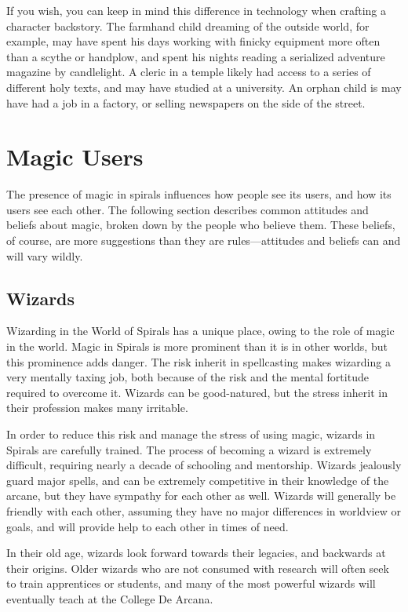 \begin{multicols}{2}
If you wish, you can keep in mind this difference in technology when crafting a character backstory.
The farmhand child dreaming of the outside world, for example, may have spent his days working with finicky equipment more often than a scythe or handplow, and spent his nights reading a serialized adventure magazine by candlelight.
A cleric in a temple likely had access to a series of different holy texts, and may have studied at a university.
An orphan child is may have had a job in a factory, or selling newspapers on the side of the street.

\section{Magic Users}
The presence of magic in spirals influences how people see its users, and how its users see each other.
The following section describes common attitudes and beliefs about magic, broken down by the people who believe them.
These beliefs, of course, are more suggestions than they are rules---attitudes and beliefs can and will vary wildly.

\subsection{Wizards}
Wizarding in the World of Spirals has a unique place, owing to the role of magic in the world.
Magic in Spirals is more prominent than it is in other worlds, but this prominence adds danger.
The risk inherit in spellcasting makes wizarding a very mentally taxing job, both because of the risk and the mental fortitude required to overcome it.
Wizards can be good-natured, but the stress inherit in their profession makes many irritable. 

In order to reduce this risk and manage the stress of using magic, wizards in Spirals are carefully trained.
The process of becoming a wizard is extremely difficult, requiring nearly a decade of schooling and mentorship.
Wizards jealously guard major spells, and can be extremely competitive in their knowledge of the arcane, but they have sympathy for each other as well.
Wizards will generally be friendly with each other, assuming they have no major differences in worldview or goals, and will provide help to each other in times of need.

In their old age, wizards look forward towards their legacies, and backwards at their origins.
Older wizards who are not consumed with research will often seek to train apprentices or students, and many of the most powerful wizards will eventually teach at the College De Arcana.


\end{multicols}
